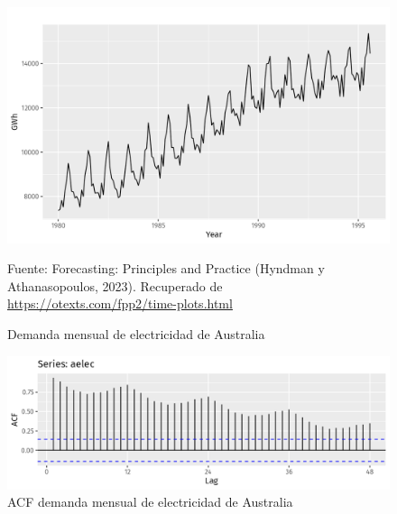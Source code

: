 \begin{itemize}
    \begin{figure}[H]
        \begin{minipage}[t]{0.9\textwidth}
            \caption{Demanda mensual de electricidad de Australia}
            \label{autocorrelaciones3}        
        \end{minipage}
    
        \vspace{10pt}
    
        \begin{minipage}[b]{1.1\textwidth}
            \centering
            \includegraphics[width=\textwidth]{img/aelec-1-ejemplo.png}        
        \end{minipage}
    
        \begin{minipage}[t]{0.9\textwidth}
            Fuente: Forecasting: Principles and Practice (Hyndman y Athanasopoulos, 2023). Recuperado de \url{https://otexts.com/fpp2/time-plots.html}
        \end{minipage}
    \end{figure}

    \begin{figure}[H]
        \begin{minipage}[t]{0.9\textwidth}
            \caption{ACF demanda mensual de electricidad de Australia}
            \label{autocorrelaciones4}        
        \end{minipage}
    
        \vspace{10pt}
    
        \begin{minipage}[b]{1.1\textwidth}
            \centering
            \includegraphics[width=\textwidth]{img/acfelec-1-ejemplo.png}        
        \end{minipage}
    

\end{figure}
\end{itemize}
